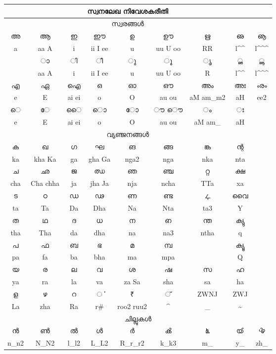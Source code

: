 \documentclass[a4paper]{article}
\makeatletter
\def\en{\color{black!80}\normalsize\En}
\def\mhat{\expandafter\@gobble\string\^}
\def\at{\expandafter\@gobble\string\@}
\def\tldchr{\expandafter\@gobble\string\~}
\def\undchr{\expandafter\@gobble\string\_}
\makeatother
\begin{document}
\Large

\centering

\begin{tabular}{|c|c|c|c|c|c|c|c|c|}
\multicolumn{8}{c}{സ്വനലേഖ നിവേശകരീതി}\\
\hline
\multicolumn{8}{c}{സ്വരങ്ങള്‍}\\
\hline
അ & ആ & ഇ & ഈ & ഉ & ഊ & ഋ & ഌ & ൡ \\
\en a &\en aa A &\en i &\en ii I ee &\en u &\en uu U oo 
        &\en RR & \en l\mhat\mhat & \en l\mhat\mhat\mhat \\
\hline
    & ാ & ി & ീ & ു & ൂ & ൃ & ൢ & ൣ \\
\en  &\en \at aa \at A &\en \at i &\en \at ii \at I \at ee &\en \at u &\en \at uu \at U \at oo
        &\en \at R & \en \at l\mhat\mhat &\en  \at l\mhat\mhat\mhat \\
\hline 
എ & ഏ & ഐ & ഒ & ഓ & ഔ & അം & അഃ & ൟ \\
\en e &\en E &\en ai ei &\en o &\en O &\en au ou &\en aM am\undchr\space m2 &\en aH & \en ee2 \\
\hline
െ & േ & ൈ &ൊ & ോ & ൗ ൌ &ം&  ഃ & \\
\en \at e &\en \at E &\en \at ai \at ei &\en \at o &\en \at O &\en  \at au  \at ou &\en \at aM am\undchr\space & \en \at aH  & \\
\hline
\multicolumn{8}{c}{വ്യഞ്ജനങ്ങള്‍}\\
\hline
ക & ഖ & ഗ & ഘ & ങ  & ങ്ങ & ങ്ക & ന്റ &\\
\en ka &\en kha Ka &\en ga &\en gha Ga& \en nga2 & \en nga &
 \en nka & \en nta &\\
\hline 
ച & ഛ & ജ & ഝ & ഞ & ഞ്ച & റ്റ  & ക്ഷ & \\
\en cha & \en Cha chha &\en ja &\en jha Ja &\en nja &\en ncha & \en TTa &\en xa &\\
\hline
ട & ഠ & ഡ & ഢ & ണ & ണ്ട & ഺ & വൈ &\\
\en ta & \en Ta &\en Da &\en Dha &\en Na & \en Nta & \en ta3 &\en Y &\\
\hline
ത & ഥ & ദ & ധ & ന & ഩ & ന്ത & ക്യു &\\
\en tha &\en Tha &\en da &\en dha & \en na & \en na3 & \en ntha & \en q &\\
\hline 
പ & ഫ & ബ & ഭ & മ & മ്പ &  & ക്യൂ  &\\
\en pa&\en fa &\en ba&\en bha & \en ma &\en mpa& & \en Q &\\
\hline
യ & ര & ല & വ & ശ & ഷ & സ & ഹ &\\
\en ya&\en ra&\en la &\en va&\en za Sa&\en sha &\en sa & \en ha &\\
\hline
ള & ഴ & റ & ൎ & ₹ & ്  &\en ZWNJ & \en ZWJ &\\
\en La &\en zha &\en Ra &\en r\# & \en roo2 ruu2 & \mhat & \undchr & \tldchr &\\
\hline
\multicolumn{9}{c}{ചില്ലുകള്‍}\\
\hline
ന്‍ & ണ്‍ & ല്‍ & ള്‍ & ര്‍ & ൿ & ൔ & ൕ & ൖ \\
\en n\undchr \space n2 &\en N\undchr \space N2 &\en l\undchr \space l2 &\en L\undchr \space L2 &\en R\undchr \space r\undchr \space r2
&\en k\undchr \space k3 & \en m\undchr & \en y\undchr & \en zh\undchr \\
\hline
\end{tabular} 
\end{document}
